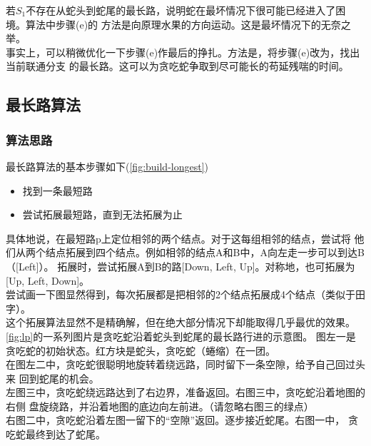 \documentclass[a4paper]{article}
\begin{document}
若$S_1$不存在从蛇头到蛇尾的最长路，说明蛇在最坏情况下很可能已经进入了困境。算法中步骤(e)的
方法是向原理水果的方向运动。这是最坏情况下的无奈之举。\\

事实上，可以稍微优化一下步骤(e)作最后的挣扎。方法是，将步骤(e)改为，找出当前联通分支
的最长路。这可以为贪吃蛇争取到尽可能长的苟延残喘的时间。

\subsection{最长路算法}
\subsubsection{算法思路}
最长路算法的基本步骤如下(\autoref{fig:build-longest})
\begin{itemize}
    \item 找到一条最短路
    \item 尝试拓展最短路，直到无法拓展为止
\end{itemize}
具体地说，在最短路p上定位相邻的两个结点。对于这每组相邻的结点，尝试将
他们从两个结点拓展到四个结点。例如相邻的结点A和B中，A向左走一步可以到达B（[Left]）。
拓展时，尝试拓展A到B的路[Down, Left, Up]。对称地，也可拓展为[Up, Left, Down]。\\

尝试画一下图显然得到，每次拓展都是把相邻的2个结点拓展成4个结点（类似于田字）。\\

这个拓展算法显然不是精确解，但在绝大部分情况下却能取得几乎最优的效果。\\


\autoref{fig:lp}的一系列图片是贪吃蛇沿着蛇头到蛇尾的最长路行进的示意图。
图左一是贪吃蛇的初始状态。红方块是蛇头，贪吃蛇（蜷缩）在一团。\\

在图左二中，贪吃蛇很聪明地旋转着绕远路，同时留下一条空隙，给予自己回过头来
回到蛇尾的机会。\\

左图三中，贪吃蛇绕远路达到了右边界，准备返回。右图三中，贪吃蛇沿着地图的右侧
盘旋绕路，并沿着地图的底边向左前进。（请忽略右图三的绿点）\\

右图二中，贪吃蛇沿着左图一留下的``空隙''返回。逐步接近蛇尾。右图一中，
贪吃蛇最终到达了蛇尾。\\
\end{document}
